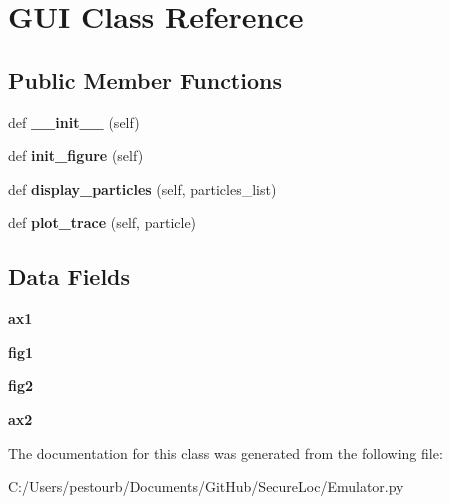 \hypertarget{class_emulator_1_1_g_u_i}{}\section{G\+UI Class Reference}
\label{class_emulator_1_1_g_u_i}
\subsection*{Public Member Functions}
\begin{DoxyCompactItemize}
\item 
\mbox{\label{class_emulator_1_1_g_u_i_ae64f0875afe3067b97ba370b354b9213}} 
def {\bfseries \+\_\+\+\_\+init\+\_\+\+\_\+} (self)
\item 
\mbox{\label{class_emulator_1_1_g_u_i_a33a245ee93cc7dcf09b702924df6ec7b}} 
def {\bfseries init\+\_\+figure} (self)
\item 
\mbox{\label{class_emulator_1_1_g_u_i_aa0681852df407443cec91ff6af1eb830}} 
def {\bfseries display\+\_\+particles} (self, particles\+\_\+list)
\item 
\mbox{\label{class_emulator_1_1_g_u_i_a31ec3f8a44a5d888b0bb27cae6770183}} 
def {\bfseries plot\+\_\+trace} (self, particle)
\end{DoxyCompactItemize}
\subsection*{Data Fields}
\begin{DoxyCompactItemize}
\item 
\mbox{\label{class_emulator_1_1_g_u_i_af8dd95942a665dc2de84d6fb11fe52e5}} 
{\bfseries ax1}
\item 
\mbox{\label{class_emulator_1_1_g_u_i_a9452f6281dfc1f84aac1036ded420476}} 
{\bfseries fig1}
\item 
\mbox{\label{class_emulator_1_1_g_u_i_a70d1f0cc750280360dbedf815c55ad23}} 
{\bfseries fig2}
\item 
\mbox{\label{class_emulator_1_1_g_u_i_a3adf294ce5390ecfe6de8b4c606c2367}} 
{\bfseries ax2}
\end{DoxyCompactItemize}


The documentation for this class was generated from the following file\+:\begin{DoxyCompactItemize}
\item 
C\+:/\+Users/pestourb/\+Documents/\+Git\+Hub/\+Secure\+Loc/Emulator.\+py\end{DoxyCompactItemize}
